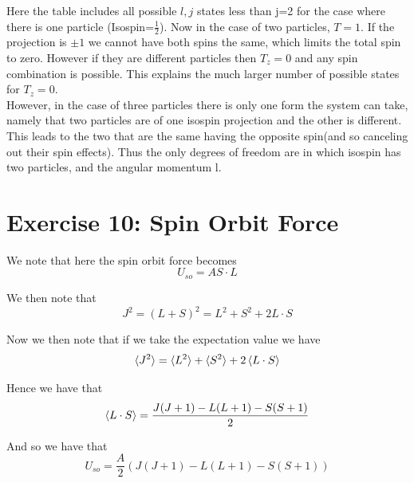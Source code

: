 \documentclass[11pt]{article} %
\begin{document}
\FloatBarrier
Here the table includes all possible $l,j$ states less than j=2 for the case where there is one particle (Isospin=$\frac{1}{2}$). Now in the case of two particles, $T=1$. If the projection is $\pm 1$ we cannot have both spins the same, which limits the total spin to zero. However if they are different particles then $T_z=0$ and any spin combination is possible. This explains the much larger number of possible states for $T_z=0$.\\

However, in the case of three particles there is only one form the system can take, namely that two particles are of one isospin projection and the other is different. This leads to the two that are the same having the opposite spin(and so canceling out their spin effects). Thus the only degrees of freedom are in which isospin has two particles, and the angular momentum l.

\section{Exercise 10: Spin Orbit Force}

We note that here the spin orbit force becomes \\

\begin{equation} U_{so}=A S \cdot L \end{equation}

We then note that\\

\begin{equation}
J^2=(L+S)^2=L^2+S^2+2L\cdot S
\end{equation}

Now we then note that if we take the expectation value we have\\

\begin{equation}
\braket{J^2}=\braket{L^2}+\braket{S^2}+2\braket{L\cdot S}
\end{equation}

Hence we have that\\

\begin{equation}
\braket{L \cdot S}=\frac{J(J+1)-L(L+1)-S(S+1)}{2}\end{equation}

And so we have that\\
\begin{equation}
U_{so}=\frac{A}{2}\left(J(J+1)-L(L+1)-S(S+1)\right)\end{equation}
\end{document}

